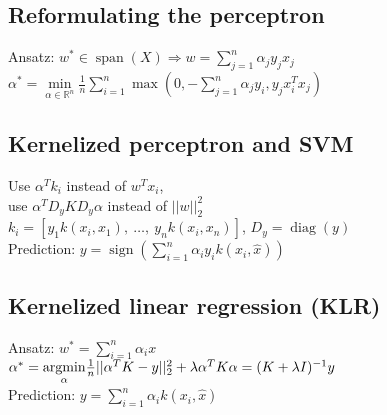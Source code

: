 \subsection*{Reformulating the perceptron}

Ansatz: $w^* \in \operatorname{span}(X) \Rightarrow w = \sum_{j=1}^n \alpha_j y_j x_j$\\
$\alpha^*= \underset{\alpha \in \mathbb{R}^n}{\operatorname{min}} \frac{1}{n} \sum_{i=1}^n \operatorname{max}(0, - \sum_{j=1}^n \alpha_j y_i,y_j x_i^T x_j)$

\subsection*{Kernelized perceptron and SVM}
Use $\alpha^T k_i$ instead of $w^T x_i$,\\
use $\alpha^T D_y K D_y \alpha$ instead of $||w||_2^2$\\ 
$k_i=[y_1 k(x_i,x_1), \ \ldots, \ y_n k(x_i,x_n)]$, $D_y = \operatorname{diag}(y)$\\
Prediction: $y = \operatorname{sign}(\sum_{i=1}^n \alpha_i y_i k(x_i, \hat{x}))$

\subsection*{Kernelized linear regression (KLR)}
Ansatz: $w^*=\sum_{i = 1}^n \alpha_i x$\\
$\alpha^*= \underset{\alpha}{\operatorname{argmin}}\frac{1}{n} ||\alpha^T K - y||_2^2 + \lambda \alpha^T K \alpha \\= (K+\lambda I)^{-1} y$\\
Prediction: $y = \sum \limits_{i=1}^n \alpha_i k(x_i,\hat{x})$